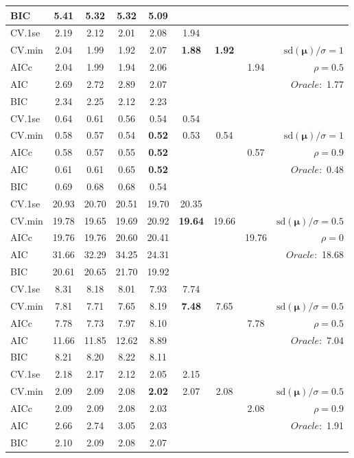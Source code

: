 \begin{table}
\begin{center}
\begin{tabular}{l*{7}{c}|r}
BIC & 5.41 & 5.32 & 5.32 & 5.09 & & & &  \\
 \hline 
CV.1se & 2.19 & 2.12 & 2.01 & 2.08 & 1.94 & & & \\
CV.min & 2.04 & 1.99 & 1.92 & 2.07 & {\bf 1.88} & {\bf 1.92} & & $\mathrm{sd}(\mathbf{\mu})/\sigma=1$ \\
AICc & 2.04 & 1.99 & 1.94 & 2.06 & & & 1.94 &  $\rho=0.5$ \\
AIC & 2.69 & 2.72 & 2.89 & 2.07 & & & &  \multirow{2}{*}{$Oracle: $ 1.77} \\
BIC & 2.34 & 2.25 & 2.12 & 2.23 & & & &  \\
 \hline 
CV.1se & 0.64 & 0.61 & 0.56 & 0.54 & 0.54 & & & \\
CV.min & 0.58 & 0.57 & 0.54 & {\bf 0.52} & 0.53 & 0.54 & & $\mathrm{sd}(\mathbf{\mu})/\sigma=1$ \\
AICc & 0.58 & 0.57 & 0.55 & {\bf 0.52} & & & 0.57 &  $\rho=0.9$ \\
AIC & 0.61 & 0.61 & 0.65 & {\bf 0.52} & & & &  \multirow{2}{*}{$Oracle: $ 0.48} \\
BIC & 0.69 & 0.68 & 0.68 & 0.54 & & & &  \\
 \hline 
CV.1se & 20.93 & 20.70 & 20.51 & 19.70 & 20.35 & & & \\
CV.min & 19.78 & 19.65 & 19.69 & 20.92 & {\bf 19.64} & 19.66 & & $\mathrm{sd}(\mathbf{\mu})/\sigma=0.5$ \\
AICc & 19.76 & 19.76 & 20.60 & 20.41 & & & 19.76 &  $\rho=0$ \\
AIC & 31.66 & 32.29 & 34.25 & 24.31 & & & &  \multirow{2}{*}{$Oracle: $ 18.68} \\
BIC & 20.61 & 20.65 & 21.70 & 19.92 & & & &  \\
 \hline 
CV.1se & 8.31 & 8.18 & 8.01 & 7.93 & 7.74 & & & \\
CV.min & 7.81 & 7.71 & 7.65 & 8.19 & {\bf 7.48} & 7.65 & & $\mathrm{sd}(\mathbf{\mu})/\sigma=0.5$ \\
AICc & 7.78 & 7.73 & 7.97 & 8.10 & & & 7.78 &  $\rho=0.5$ \\
AIC & 11.66 & 11.85 & 12.62 & 8.89 & & & &  \multirow{2}{*}{$Oracle: $ 7.04} \\
BIC & 8.21 & 8.20 & 8.22 & 8.11 & & & &  \\
 \hline 
CV.1se & 2.18 & 2.17 & 2.12 & 2.05 & 2.15 & & & \\
CV.min & 2.09 & 2.09 & 2.08 & {\bf 2.02} & 2.07 & 2.08 & & $\mathrm{sd}(\mathbf{\mu})/\sigma=0.5$ \\
AICc & 2.09 & 2.09 & 2.08 & 2.03 & & & 2.08 &  $\rho=0.9$ \\
AIC & 2.66 & 2.74 & 3.05 & 2.03 & & & &  \multirow{2}{*}{$Oracle: $ 1.91} \\
BIC & 2.10 & 2.09 & 2.08 & 2.07 & & & &  \\
 \hline 
\end{tabular}
\end{center}
\vspace{-1cm}
\end{table}




